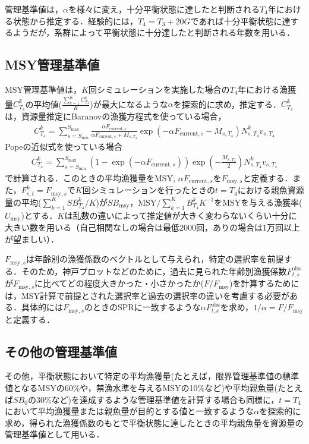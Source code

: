 \documentclass[11pt]{jsarticle}
\begin{document}
管理基準値は，$\alpha$を様々に変え，十分平衡状態に達したと判断される$T_4$年における状態から推定する．経験的には，$T_4=T_3+20G$であれば十分平衡状態に達するようだが，系群によって平衡状態に十分達したと判断される年数を用いる．

\subsection{MSY管理基準値}
MSY管理基準値は，$K$回シミュレーションを実施した場合の$T_4$年における漁獲量$C_{T_4}^k$の平均値($\frac{\sum_{k=1}^K C_{T_4}^k}{K}$)が最大になるような$\alpha$を探索的に求め，推定する．$C_{T_4}^k$は，資源量推定にBaranovの漁獲方程式を使っている場合，
\begin{eqnarray}
  C_{T_4}^k=\sum_{s=S_{\mathrm{min}}}^{S_{\mathrm{max}}} \frac{\alpha F_{\mathrm{current},s}}{\alpha F_{\mathrm{current},s}+M_{s,T_4}}
  \exp(-\alpha F_{\mathrm{current},s}-M_{s,T_4}) N_{s,T_4}^k v_{s,T_4}
\end{eqnarray}
Popeの近似式を使っている場合
\begin{eqnarray}
  C_{T_4}^k=\sum_{s=S_{\mathrm{min}}}^{S_{\mathrm{max}}} (1-\exp(-\alpha F_{\mathrm{current},s})) \exp(-\frac{M_{s,T_4}}{2})N_{s,T_4}^k v_{s,T_4} 
\end{eqnarray}
で計算される．このときの平均漁獲量を$\mathrm{MSY}$, $\alpha F_{\mathrm{current},s}$を$F_{\mathrm{msy},s}$と定義する．また，$F_{s,t}^k=F_{\mathrm{msy},s}$で$K$回シミュレーションを行ったときの$t=T_4$における親魚資源量の平均($\sum_{k=1}^K S\!B_{T_4}^k /K$)が$S\!B_{\mathrm{msy}}$，$\mathrm{MSY}/ \sum_{k=1}^K B_{T_4}^k K^{-1}$をMSYを与える漁獲率($U_{\mathrm{msy}}$)とする．$K$は乱数の違いによって推定値が大きく変わらないくらい十分に大きい数を用いる（自己相関なしの場合は最低2000回，ありの場合は1万回以上が望ましい）．

$F_{\mathrm{msy},s}$は年齢別の漁獲係数のベクトルとして与えられ，特定の選択率を前提する．そのため，神戸プロットなどのために，過去に見られた年齢別漁獲係数$F_{t,s}^{\mathrm{obs}}$が$F_{\mathrm{msy},s}$に比べてどの程度大きかった・小さかったか($F/F_{\mathrm{msy}}$)を計算するためには，MSY計算で前提とされた選択率と過去の選択率の違いを考慮する必要がある．具体的には$F_{\mathrm{msy},s}$のときのSPRに一致するような$\alpha F_{t,s}^{\mathrm{obs}}$を求め，$1/\alpha=F/F_{\mathrm{msy}}$と定義する．

\subsection{その他の管理基準値}
その他，平衡状態において特定の平均漁獲量(たとえば，限界管理基準値の標準値となるMSYの60\%や，禁漁水準を与えるMSYの10\%など)や平均親魚量(たとえば$S\!B_0$の30\%など)を達成するような管理基準値を計算する場合も同様に，$t=T_4$において平均漁獲量または親魚量が目的とする値と一致するような$\alpha$を探索的に求め，得られた漁獲係数のもとで平衡状態に達したときの平均親魚量を資源量の管理基準値として用いる．
\end{document}
